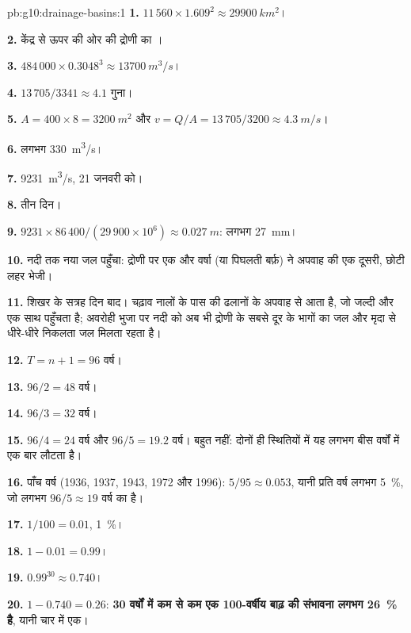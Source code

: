 \begin{solution}{pb:g10:drainage-basins:1}
\textbf{1.} $11\,560 \times 1.609^2 \approx \qty{29900}{km^2}$।

\textbf{2.} केंद्र से ऊपर की ओर की द्रोणी का ।

\textbf{3.} $484\,000 \times 0.3048^3 \approx \qty{13700}{m^3/s}$।

\textbf{4.} $13\,705/3341 \approx 4.1$ गुना।

\textbf{5.} $A = 400 \times 8 = \qty{3200}{m^2}$ और $v = Q/A = 13\,705/3200
\approx \qty{4.3}{m/s}$।

\textbf{6.} लगभग \qty{330}{m^3/s}।

\textbf{7.} \qty{9231}{m^3/s}, 21 जनवरी को।

\textbf{8.} तीन दिन।

\textbf{9.} $9231 \times 86\,400/(29\,900 \times 10^6) \approx
\qty{0.027}{m}$: लगभग \qty{27}{mm}।

\textbf{10.} नदी तक नया जल पहुँचा: द्रोणी पर एक और वर्षा
(या पिघलती बर्फ़) ने अपवाह की एक दूसरी, छोटी लहर भेजी।

\textbf{11.} शिखर के सत्रह दिन बाद। चढ़ाव नालों के पास की ढलानों के
अपवाह से आता है, जो जल्दी और एक साथ पहुँचता है; अवरोही भुजा पर
नदी को अब भी द्रोणी के सबसे दूर के भागों का जल और मृदा से धीरे-धीरे
निकलता जल मिलता रहता है।

\textbf{12.} $T = n + 1 = 96$ वर्ष।

\textbf{13.} $96/2 = 48$ वर्ष।

\textbf{14.} $96/3 = 32$ वर्ष।

\textbf{15.} $96/4 = 24$ वर्ष और $96/5 = 19.2$ वर्ष। बहुत नहीं: दोनों ही स्थितियों में
यह  लगभग बीस वर्षों में एक बार लौटता है।

\textbf{16.} पाँच वर्ष (1936, 1937, 1943, 1972 और 1996): $5/95 \approx
0.053$, यानी प्रति वर्ष लगभग \qty{5}{\percent}, जो लगभग
$96/5 \approx 19$ वर्ष का  है।

\textbf{17.} $1/100 = 0.01$, \qty{1}{\percent}।

\textbf{18.} $1 - 0.01 = 0.99$।

\textbf{19.} $0.99^{30} \approx 0.740$।

\textbf{20.} $1 - 0.740 = 0.26$: \textbf{30 वर्षों में कम से कम एक
100-वर्षीय बाढ़ की संभावना लगभग \qty{26}{\percent} है}, यानी चार में एक।
\end{solution}
